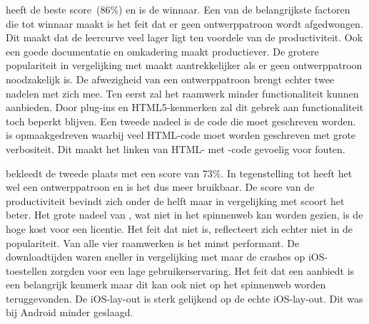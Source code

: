 \jqm{} heeft de beste score~($86\%$) en is de winnaar.
Een van de belangrijkste factoren die \jqm{} tot winnaar maakt is het feit dat er geen ontwerppatroon wordt afgedwongen.
Dit maakt dat de leercurve veel lager ligt ten voordele van de productiviteit.
Ook een goede documentatie en omkadering maakt \jqm{} productiever.
De grotere populariteit in vergelijking met \lungo{} maakt \jqm{} aantrekkelijker als er geen ontwerppatroon noodzakelijk is.
De afwezigheid van een ontwerppatroon brengt echter twee nadelen met zich mee.
Ten eerst zal het raamwerk minder functionaliteit kunnen aanbieden.
Door plug-ins en HTML5-kenmerken zal dit gebrek aan functionaliteit toch beperkt blijven.
Een tweede nadeel is de code die moet geschreven worden.
\jqm{} is opmaakgedreven waarbij veel HTML-code moet worden geschreven met grote verbositeit.
Dit maakt het linken van HTML- met \js{}-code gevoelig voor fouten.


\kendo{} bekleedt de tweede plaats met een score van $73\%$.
In tegenstelling tot \jqm{} heeft het wel een ontwerppatroon en is het dus meer bruikbaar.
De score van de productiviteit bevindt zich onder de helft maar in vergelijking met \st{} scoort het beter.
Het grote nadeel van \kendo{},  wat niet in het spinnenweb kan worden gezien,  is de hoge kost voor een licentie.
Het feit dat \kendo{} niet  is, reflecteert zich echter niet in de populariteit.
Van alle vier raamwerken is \kendo{} het minst performant.
De downloadtijden waren sneller in vergelijking met \st{} maar de crashes op iOS-toestellen zorgden voor een lage gebruikerservaring.
Het feit dat \kendo{} een  aanbiedt is een belangrijk kenmerk maar dit kan ook niet op het spinnenweb worden teruggevonden.
De iOS-lay-out is sterk gelijkend op de echte iOS-lay-out.
Dit was bij Android minder geslaagd.


